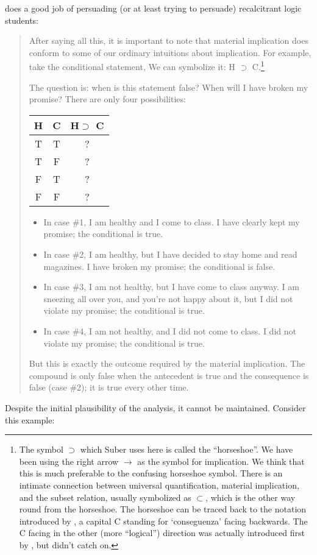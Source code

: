 \citet{suber:1997:material} does a good job of persuading (or at least trying to persuade) recalcitrant logic students:

\begin{quote}
	
	After saying all this, it is important to note that material implication does conform to some of our ordinary intuitions about implication. For example, take the conditional statement,  We can symbolize it: H $\supset$ C.\footnote{The symbol $\supset$ which Suber uses here is called the ``horseshoe''. We have been using the right arrow $\rightarrow$ as the symbol for implication. We think that this is much preferable to the confusing horseshoe symbol. There is an intimate connection between universal quantification, material implication, and the subset relation, usually symbolized as $\subset$, which is the other way round from the horseshoe. The horseshoe can be traced back to the notation introduced by \citet{peano:1889:nova}, a capital C standing for `conseguenza' facing backwards. The C facing in the other (more ``logical'') direction was actually introduced first by \citet{gergonne:1817:essai}, but didn't catch on.}
	
	The question is: when is this statement false? When will I have broken my promise? There are only four possibilities:
	
	\begin{center}
		\begin{tabular}
			{c|c||c} H & C & H$\supset$ C\\
			\hline T & T & ?\\
			T & F & ?\\
			F & T & ?\\
			F & F & ? 
		\end{tabular}
	\end{center}

\begin{itemize}
		
		\item In case \#1, I am healthy and I come to class. I have clearly kept my promise; the conditional is true. 
		\item In case \#2, I am healthy, but I have decided to stay home and read magazines. I have broken my promise; the conditional is false. 
		\item In case \#3, I am not healthy, but I have come to class anyway. I am sneezing all over you, and you're not happy about it, but I did not violate my promise; the conditional is true. 
		\item In case \#4, I am not healthy, and I did not come to class. I did not violate my promise; the conditional is true. 

\end{itemize}
%	
But this is exactly the outcome required by the material implication. The compound is only false when the antecedent is true and the consequence is false (case \#2); it is true every other time.

\end{quote}
%
Despite the initial plausibility of the analysis, it cannot be maintained. Consider this example:

